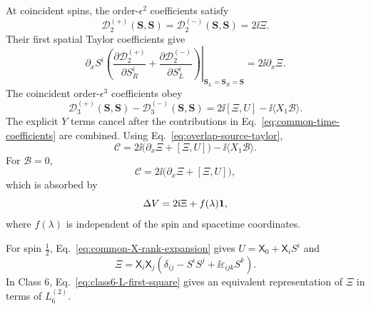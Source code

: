 At coincident spins, the order-$\epsilon^2$ coefficients satisfy
\begin{equation}
\mathcal D^{(+)}_2(\boldsymbol S,\boldsymbol S)
=\mathcal D^{(-)}_2(\boldsymbol S,\boldsymbol S)
=2\ii\Xi.
\label{eq:common-quadratic-overlap}
\end{equation}
Their first spatial Taylor coefficients give
\begin{equation}
\partial_x S^i
\left.
\left(
\frac{\partial\mathcal D^{(+)}_2}{\partial S_R^i}
+\frac{\partial\mathcal D^{(-)}_2}{\partial S_L^i}
\right)\right|_{\boldsymbol S_L=\boldsymbol S_R=\boldsymbol S}
=2\ii\partial_x\Xi.
\label{eq:common-quadratic-Taylor}
\end{equation}
The coincident order-$\epsilon^3$ coefficients obey
\begin{equation}
\mathcal D^{(+)}_3(\boldsymbol S,\boldsymbol S)
-\mathcal D^{(-)}_3(\boldsymbol S,\boldsymbol S)
=2\ii[\Xi,U]-\ii\langle X_1\mathcal B\rangle.
\label{eq:common-cubic-overlap}
\end{equation}
The explicit $Y$ terms cancel after the contributions in
Eq.~\eqref{eq:common-time-coefficients} are combined.  Using
Eq.~\eqref{eq:overlap-source-taylor},
\begin{equation}
\mathcal C
=2\ii\bigl(\partial_x\Xi+[\Xi,U]\bigr)
-\ii\langle X_1\mathcal B\rangle.
\label{eq:common-source-with-residual}
\end{equation}
For $\mathcal B=0$,
\begin{equation}
\mathcal C
=2\ii\bigl(\partial_x\Xi+[\Xi,U]\bigr),
\label{eq:common-source-general}
\end{equation}
which is absorbed by
\begin{equation}
\Delta V=2\mathrm{i}\Xi+f(\lambda)\mathbf{1},
\label{eq:common-DeltaV-general}
\end{equation}
where $f(\lambda)$ is independent of the spin and spacetime coordinates.

For spin $\tfrac12$, Eq.~\eqref{eq:common-X-rank-expansion} gives
$U=\mathsf X_0+\mathsf X_iS^i$ and
\begin{equation}
\Xi
=\mathsf X_i\mathsf X_j
\left(\delta_{ij}-S^iS^j+\ii\varepsilon_{ijk}S^k\right).
\label{eq:common-Xi-from-U}
\end{equation}
In Class 6, Eq.~\eqref{eq:class6-L-first-square} gives an equivalent
representation of $\Xi$ in terms of $L_6^{(2)}$.
